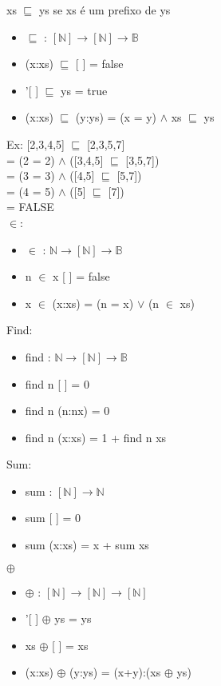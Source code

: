 \documentclass[12pt, a4paper]{article}
\begin{document}
			xs $\sqsubseteq$ ys se xs \'e um prefixo de ys
			\begin{itemize}
			\item $\sqsubseteq$ : $[\mathbb{N}] \rightarrow [\mathbb{N}] \rightarrow \mathbb{B}  $
			\item (x:xs) $\sqsubseteq$ [ ] = false
			\item '[ ] $\sqsubseteq$ ys = true
			\item (x:xs) $\sqsubseteq$ (y:ys) = (x = y) $\land$ xs $\sqsubseteq$ ys\\
			\end{itemize}
			Ex: [2,3,4,5] $\sqsubseteq$ [2,3,5,7]\\
			= (2 = 2) $\land$ ([3,4,5] $\sqsubseteq$ [3,5,7])\\
			= (3 = 3) $\land$ ([4,5] $\sqsubseteq$ [5,7])\\
			= (4 = 5) $\land$ ([5] $\sqsubseteq$ [7])\\
			= FALSE\\

			$\in$:
			\begin{itemize}
			\item $\in$ : $\mathbb{N} \rightarrow [\mathbb{N}] \rightarrow \mathbb{B}$
			\item n $\in$ x [ ] = false
			\item x $\in$ (x:xs) = (n = x) $\vee$ (n $\in$ xs) \\
			\end{itemize}

			Find:
			\begin{itemize}
			\item find : $\mathbb{N} \rightarrow [\mathbb{N}] \rightarrow \mathbb{B}$
			\item find n [ ] = 0
			\item find n (n:nx) = 0
			\item find n (x:xs) = 1 + find n xs\\
			\end{itemize}

			Sum:
			\begin{itemize}
			\item sum : $[\mathbb{N}] \rightarrow \mathbb{N}$
			\item sum [ ] = 0
			\item sum (x:xs) = x + sum xs\\
			\end{itemize}

			$\oplus$
			\begin{itemize}
			\item $\oplus$ : $[\mathbb{N}] \rightarrow [\mathbb{N}] \rightarrow [\mathbb{N}]$
			\item '[ ] $\oplus$ ys = ys
			\item xs $\oplus$ [ ] = xs
			\item (x:xs) $\oplus$ (y:ys) = (x+y):(xs $\oplus$ ys)\\
			\end{itemize}
\end{document}
